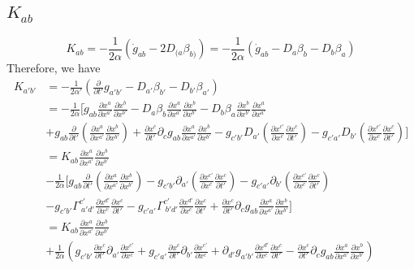 \documentclass{article}
\begin{document}
\subsection{$K_{ab}$}
\[
K_{ab} = -\frac{1}{2\alpha}({\dot g}_{ab} - 2 D_{(a}\beta_{b)}) = -\frac{1}{2\alpha}({\dot g}_{ab} - D_{a}\beta_{b} - D_{b}\beta_{a})
\]
Therefore, we have
\begin{align*}
K_{a'b'} & = -\frac{1}{2\alpha'}(\frac{\partial}{\partial t'}g_{a'b'} - D_{a'}\beta_{b'} - D_{b'}\beta_{a'})\\
& = -\frac{1}{2\alpha}[{\dot g}_{ab}\frac{\partial x^{a}}{\partial x^{a'}}\frac{\partial x^{b}}{\partial x^{b'}} - D_{a}\beta_{b}\frac{\partial x^{a}}{\partial x^{a'}}\frac{\partial x^{b}}{\partial x^{b'}} - D_{b}\beta_{a}\frac{\partial x^{b}}{\partial x^{b'}}\frac{\partial x^{a}}{\partial x^{a'}}\\
& + g_{ab}\frac{\partial}{\partial t'}(\frac{\partial x^{a}}{\partial x^{a'}}\frac{\partial x^{b}}{\partial x^{b'}}) +  \frac{\partial x^{c}}{\partial t'}\partial_{c}g_{ab}\frac{\partial x^{a}}{\partial x^{a'}}\frac{\partial x^{b}}{\partial x^{b'}} - g_{c'b'}D_{a'}(\frac{\partial x^{c'}}{\partial x^{c}}\frac{\partial x^{c}}{\partial t'}) - g_{c'a'}D_{b'}(\frac{\partial x^{c'}}{\partial x^{c}}\frac{\partial x^{c}}{\partial t'})]\\
& = K_{ab}\frac{\partial x^{a}}{\partial x^{a'}}\frac{\partial x^{b}}{\partial x^{b'}} \\
& - \frac{1}{2\alpha}[g_{ab}\frac{\partial}{\partial t'}(\frac{\partial x^{a}}{\partial x^{a'}}\frac{\partial x^{b}}{\partial x^{b'}}) - g_{c'b'}\partial_{a'}(\frac{\partial x^{c'}}{\partial x^{c}}\frac{\partial x^{c}}{\partial t'})  - g_{c'a'}\partial_{b'}(\frac{\partial x^{c'}}{\partial x^{c}}\frac{\partial x^{c}}{\partial t'})\\
&  - g_{c'b'}\Gamma^{c'}_{~a'd'}\frac{\partial x^{d'}}{\partial x^{c}}\frac{\partial x^{c}}{\partial t'} - g_{c'a'}\Gamma^{c'}_{~b'd'}\frac{\partial x^{d'}}{\partial x^{c}}\frac{\partial x^{c}}{\partial t'} + \frac{\partial x^{c}}{\partial t'}\partial_{c}g_{ab}\frac{\partial x^{a}}{\partial x^{a'}}\frac{\partial x^{b}}{\partial x^{b'}}]\\
& = K_{ab}\frac{\partial x^{a}}{\partial x^{a'}}\frac{\partial x^{b}}{\partial x^{b'}}\\
& + \frac{1}{2\alpha}(g_{c'b'}\frac{\partial x^{c}}{\partial t'}\partial_{a'}\frac{\partial x^{c'}}{\partial x^{c}} + g_{c'a'}\frac{\partial x^{c}}{\partial t'}\partial_{b'}\frac{\partial x^{c'}}{\partial x^{c}} + \partial_{d'}g_{a'b'}\frac{\partial x^{d'}}{\partial x^{c}}\frac{\partial x^{c}}{\partial t'} - \frac{\partial x^{c}}{\partial t'}\partial_{c}g_{ab}\frac{\partial x^{a}}{\partial x^{a'}}\frac{\partial x^{b}}{\partial x^{b'}})\\

\end{align*}
\end{document}
